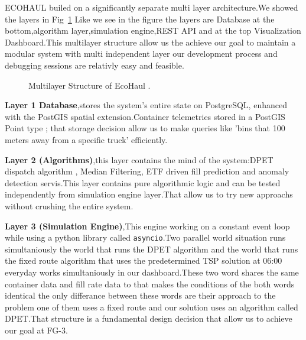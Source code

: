 \documentclass[12pt,a4paper]{report}
\begin{document}
\indent ECOHAUL builed on a significantly separate multi layer architecture.We showed the layers in  Fig~\ref{fig:arch_layers}
Like we see in the figure the layers are Database at the bottom,algorithm layer,simulation engine,REST API and at the top Visualization Dashboard.This multilayer structure allow us the achieve our goal to maintain a modular system with multi independent layer our development process and debugging sessions are relativly easy and feasible.

\begin{figure}[H]
\centering
{}
\caption{Multilayer Structure of EcoHaul .}
\label{fig:arch_layers}
\end{figure}


\indent \textbf{Layer 1 {Database}},stores the system's entire state on PostgreSQL, enhanced with the PostGIS spatial extension.Container telemetries stored in a PostGIS Point type ; that storage decision allow us to make queries like 'bins that 100 meters away from a specific truck' efficiently.


\indent \textbf{Layer 2 (Algorithms)},this layer contains the mind of the system:DPET dispatch algorithm , Median Filtering, ETF driven fill prediction and anomaly detection servis.This layer contains pure algorithmic logic and can be tested independently  from simulation engine layer.That allow us to try new approachs without crushing the entire system.


\indent \textbf{Layer 3 (Simulation Engine)},This engine working on a constant event loop while using a python library called \texttt{asyncio}.Two parallel world situation runs simultaniously the world that runs the DPET algorithm and the world that runs the fixed route algorithm that uses the predetermined TSP solution at 06:00 everyday works simultaniously in our dashboard.These two word shares the same container data and fill rate data to that makes the conditions of the both words identical the only differance between these words are their approach to the problem one of them uses a fixed route and our solution uses an algorithm called DPET.That structure is a fundamental design decision that allow us to achieve our goal at FG-3.
\end{document}
